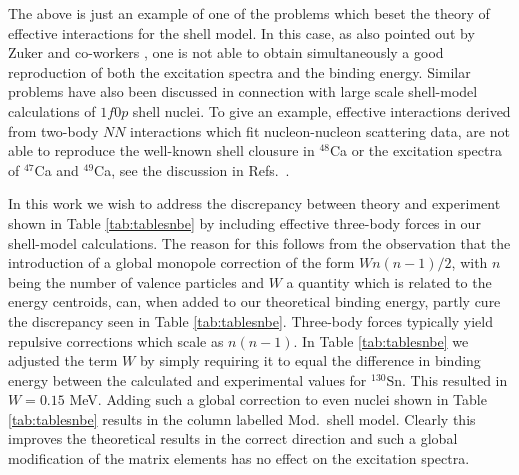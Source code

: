 \documentclass{article}
\begin{document}
The above is just an example of one of the problems which beset the theory
of effective interactions for the shell model. In this case, as also
pointed out by Zuker and co-workers \cite{zuker1},
one is not able to obtain simultaneously a good reproduction
of both the excitation spectra and the binding energy. Similar problems
have also been discussed in connection with large scale shell-model
calculations of $1f0p$ shell nuclei. To give an example, effective
interactions derived from two-body $NN$ interactions which fit 
nucleon-nucleon scattering data, are not able to reproduce the 
well-known shell clousure in $^{48}$Ca or the excitation spectra 
of $^{47}$Ca and $^{49}$Ca, see the discussion in Refs.\ \cite{alex,hko95,zuker1}.

In this work we wish to address the discrepancy between theory and experiment
shown in Table \ref{tab:tablesnbe} by including effective three-body
forces in our shell-model calculations. The reason for this follows
from the observation that the introduction of a global monopole correction
of the form $Wn(n-1)/2$, with $n$ being the number of valence particles and
$W$ a quantity which is related to the energy centroids, 
can, when added to our theoretical binding energy, partly cure the 
discrepancy seen in Table \ref{tab:tablesnbe}. Three-body forces
typically yield repulsive corrections which scale as $n(n-1)$.  
In Table \ref{tab:tablesnbe} we adjusted the term $W$ by simply requiring
it to equal the difference in binding energy between the calculated and
experimental values for $^{130}$Sn. This resulted in $W=0.15$ MeV.
Adding such a global correction to even nuclei shown in Table  
\ref{tab:tablesnbe} results in the column labelled Mod.\ shell model.
Clearly this improves the theoretical results in the correct direction
and such a global modification of the matrix elements has no
effect on the excitation spectra. 
\end{document}
